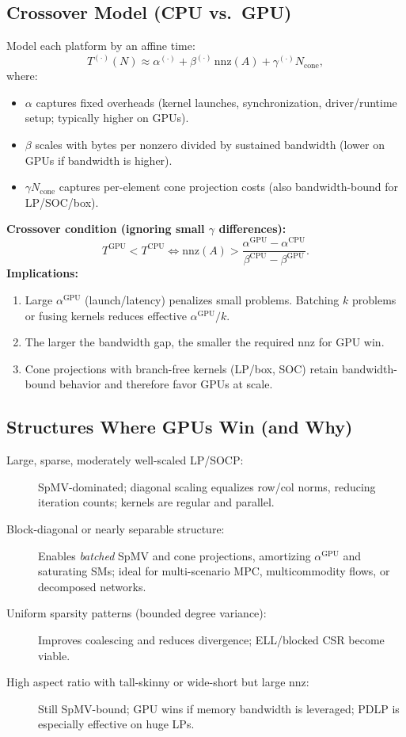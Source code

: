 \documentclass[12pt]{article}
\begin{document}
\subsection*{Crossover Model (CPU vs.\ GPU)}
Model each platform by an affine time:
\[
T^{(\cdot)}(N) \approx \alpha^{(\cdot)} + \beta^{(\cdot)} \,\mathrm{nnz}(A) + \gamma^{(\cdot)} N_{\text{cone}},
\]
where:
\begin{itemize}
  \item $\alpha$ captures fixed overheads (kernel launches, synchronization, driver/runtime setup; typically higher on GPUs).
  \item $\beta$ scales with bytes per nonzero divided by sustained bandwidth (lower on GPUs if bandwidth is higher).
  \item $\gamma N_{\text{cone}}$ captures per-element cone projection costs (also bandwidth-bound for LP/SOC/box).
\end{itemize}
\textbf{Crossover condition (ignoring small $\gamma$ differences):}
\[
T^{\text{GPU}} < T^{\text{CPU}} 
\iff 
\mathrm{nnz}(A) > \frac{\alpha^{\text{GPU}} - \alpha^{\text{CPU}}}{\beta^{\text{CPU}} - \beta^{\text{GPU}}}.
\]
\textbf{Implications:}
\begin{enumerate}
  \item Large $\alpha^{\text{GPU}}$ (launch/latency) penalizes small problems. Batching $k$ problems or fusing kernels reduces effective $\alpha^{\text{GPU}}/k$.
  \item The larger the bandwidth gap, the smaller the required $\mathrm{nnz}$ for GPU win.
  \item Cone projections with branch-free kernels (LP/box, SOC) retain bandwidth-bound behavior and therefore favor GPUs at scale.
\end{enumerate}

\subsection*{Structures Where GPUs Win (and Why)}
\begin{description}
  \item[Large, sparse, moderately well-scaled LP/SOCP:] SpMV-dominated; diagonal scaling equalizes row/col norms, reducing iteration counts; kernels are regular and parallel.
  \item[Block-diagonal or nearly separable structure:] Enables \emph{batched} SpMV and cone projections, amortizing $\alpha^{\text{GPU}}$ and saturating SMs; ideal for multi-scenario MPC, multicommodity flows, or decomposed networks.
  \item[Uniform sparsity patterns (bounded degree variance):] Improves coalescing and reduces divergence; ELL/blocked CSR become viable.
  \item[High aspect ratio with tall-skinny or wide-short but large $\mathrm{nnz}$:] Still SpMV-bound; GPU wins if memory bandwidth is leveraged; PDLP is especially effective on huge LPs.
\end{description}
\end{document}
